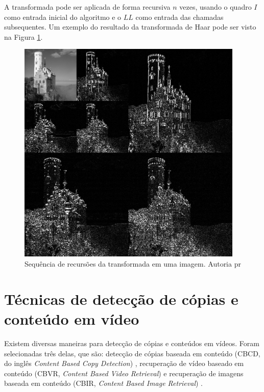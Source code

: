 A transformada pode ser aplicada de forma recursiva $n$ vezes, usando o quadro $I$ como entrada inicial do algoritmo e o $LL$ como entrada das chamadas subsequentes. Um exemplo do resultado da transformada de Haar pode ser visto na Figura \ref{fig:transf_haar}.

 \begin{figure}[h]
      \centering
      \includegraphics[width=0.96\textwidth]{dados/figuras/haar.png}
      \caption{Sequência de recursões da transformada em uma imagem. Autoria pr}
      \label{fig:transf_haar}
    \end{figure}  

\section{Técnicas de detecção de cópias e conteúdo em vídeo} 
     
     Existem diversas maneiras para detecção de cópias e conteúdos em vídeos. Foram selecionadas três delas, que são: detecção de cópias baseada em conteúdo (CBCD, do inglês \textit{Content Based Copy Detection}) \citeauthor{jiang2011pku}, recuperação de vídeo baseado em conteúdo (CBVR, \textit{Content Based Video Retrieval}) \citeauthor{law2007video} e recuperação de imagens baseada em conteúdo (CBIR, \textit{Content Based Image Retrieval}) \citeauthor{gudivada1995content}.
     

